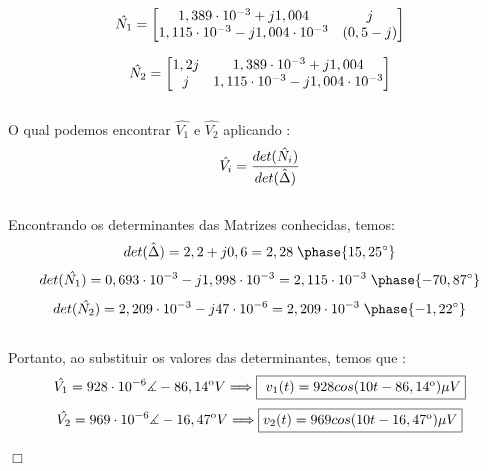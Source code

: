 \documentclass[
	12pt,				%
	oneside,			%
	a4paper,			%
	english,			%
	french,				%
	spanish,			%
	brazil				%
	]{abntex2}
\begin{document}
\begin{equation*}
    \centering
    \hat{N_1}=
    \begin{bmatrix}
         1,389 \cdot 10^{-3} + j1,004 & j \\
         1,115 \cdot 10^{-3} -  j1,004\cdot 10^{-3} & (0,5 - j)\\
    \end{bmatrix}
\end{equation*}

\begin{equation*}
    \centering
        \hat{N_2}=
    \begin{bmatrix}
        1,2j & 1,389 \cdot 10^{-3} + j1,004 \\
        j & 1,115 \cdot 10^{-3} -  j1,004\cdot 10^{-3}\\
    \end{bmatrix}
\end{equation*}\\
O qual podemos encontrar $ \hat{V_1} $ e  $ \hat{V_2} $ aplicando :
\begin{equation*}
    \centering
    \hat{V_i} = \dfrac{det( \hat{N_i} )}{det( \hat{\Delta} )}
\end{equation*}\\
Encontrando os determinantes das Matrizes conhecidas, temos:
    $$det( \hat{\Delta} ) = 2,2 + j0,6 = 2,28\;\phase{15,25^{\circ}} $$
    $$det( \hat{N_1} ) = 0,693 \cdot 10^{-3} - j1,998 \cdot 10^{-3}= 2,115\cdot10^{-3}\;\phase{-70,87^{\circ}}$$ 
    $$det( \hat{N_2} ) = 2,209 \cdot 10^{-3} - j47 \cdot 10^{-6} 
    = 2,209\cdot10^{-3}\;\phase{-1,22^{\circ}}$$\\
Portanto, ao substituir os valores das determinantes, temos que :
\begin{equation}
    \centering
    \hat{V_1} = 928 \cdot 10^{-6} \measuredangle -86,14 \textsuperscript{o} V \Longrightarrow \fbox{ ${v_1} ( t ) = 928 cos (10t-86,14 \textsuperscript{o} ) \mu V $}
\end{equation}
\begin{equation}
    \centering
    \hat{V_2} = 969 \cdot 10^{-6} \measuredangle -16,47 \textsuperscript{o} V \Longrightarrow \fbox{${v_2} ( t )= 969 cos (10t-16,47 \textsuperscript{o} ) \mu V $}
\end{equation}

\begin{flushright}
    $\Box$
\end{flushright}

\newpage
\end{document}
